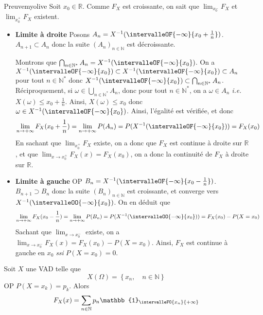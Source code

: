    \begin{demo}{Preuve}{myolive}
        Soit $x_0 \in \mathbb{R}$. Comme $F_X$ est croissante, on sait que $\lim_{x_0^-} F_X$ et $\lim_{x_0^+} F_X$ existent. 
        \begin{itemize}
            \item \textbf{Limite à droite} \quad Posons $A_n = X^{-1}(\intervalleOF{-\infty}{x_0 + \frac{1}{n}})$. $A_{n+1} \subset A_n$ donc la suite $(A_n)_{n \in \mathbb{N}}$ est décroissante. 
            
            Montrons que $\bigcap_{n \in \mathbb{N}^*} A_n = X^{-1}(\intervalleOF{-\infty}{x_0})$. On a $X^{-1}(\intervalleOF{-\infty}{x_0}) \subset X^{-1}(\intervalleOF{-\infty}{x_0}) \subset A_n$ pour tout $n \in \mathbb{N}^*$ donc $X^{-1}(\intervalleOF{-\infty}{x_0}) \subset \bigcap_{n \in \mathbb{N}^*} A_n$. Réciproquement, si $\omega \in \bigcup_{n \in \mathbb{N}^*} A_n$, donc pour tout $n \in \mathbb{N}^*$, on a $\omega \in A_n$ \textit{i.e.} $X(\omega) \leq x_0 + \frac{1}{n}$. Ainsi, $X(\omega) \leq x_0$ donc $\omega \in X^{-1}(\intervalleOF{-\infty}{x_0})$. Ainsi, l’égalité est vérifiée, et donc 
            \[ \lim_{n \to +\infty} F_X(x_0 + \frac{1}{n}) = \lim_{n \to +\infty} P(A_n) = P(X^{-1}(\intervalleOF{-\infty}{x_0})) = F_X(x_0) \]  
            En sachant que $\lim_{x_0^+} F_X$ existe, on a donc que $F_X$ est continue à droite sur $\mathbb{R}$, et que $\lim_{x \to x_0^+} F_X(x) = F_X(x_0)$, on a donc la continuité de $F_X$ à droite sur $\mathbb{R}$.
            \item \textbf{Limite à gauche} \quad OP $B_n = X^{-1}(\intervalleOF{-\infty}{x_0 - \frac{1}{n}})$. $B_{n+1} \supset B_n$ donc la suite $(B_n)_{n \in \mathbb{N}}$ est croissante, et converge vers $X^{-1}(\intervalleOO{-\infty}{x_0})$. On en déduit que 
            \[ \lim_{n \to +\infty} F_X(x_0 - \frac{1}{n}) = \lim_{n \to +\infty} P(B_n) = P(X^{-1}(\intervalleOO{-\infty}{x_0})) = F_X(x_0) - P(X = x_0) \]   
            Sachant que $\lim_{x \to x_0^-}$ existe, on a $\lim_{x \to x_0^-} F_X(x) = F_X(x_0) - P(X = x_0)$. Ainsi, $F_X$ est continue à gauche en $x_0$ \textit{ssi} $P(X = x_0) = 0$.
        \end{itemize}
    \end{demo}

    \begin{prop}{}{}
        Soit $X$ une VAD telle que 
        \[ X(\Omega) = \left\{x_n, \quad n \in \mathbb{N}\right\} \]   
        OP $P(X = x_k) = p_k$. Alors 
        \[ F_X(x) = \sum_{n \in \mathbb{N}} p_n \mathbb{1}_{\intervalleFO{x_n}{+\infty}} \]   
    \end{prop}


